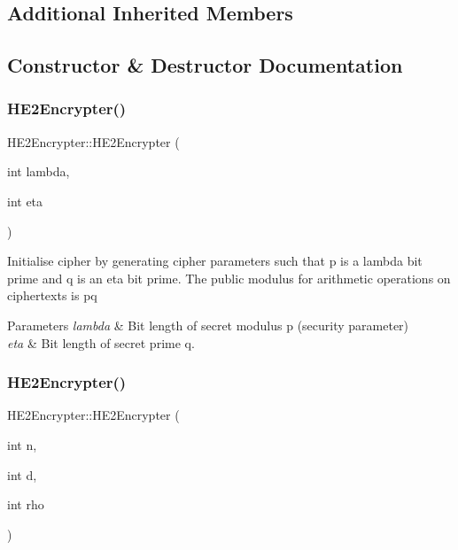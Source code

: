 \subsection*{Additional Inherited Members}


\subsection{Constructor \& Destructor Documentation}
\mbox{\label{classHE2Encrypter_afa15786431e27f582fb4b62282407ed4}} 
\subsubsection{\texorpdfstring{H\+E2\+Encrypter()}{HE2Encrypter()}\hspace{0.1cm}{\footnotesize\ttfamily [1/2]}}
{\footnotesize\ttfamily H\+E2\+Encrypter\+::\+H\+E2\+Encrypter (\begin{DoxyParamCaption}\item[{int}]{lambda,  }\item[{int}]{eta }\end{DoxyParamCaption})}

Initialise cipher by generating cipher parameters such that {\ttfamily p} is a {\ttfamily lambda} bit prime and {\ttfamily q} is an {\ttfamily eta} bit prime. The public modulus for arithmetic operations on ciphertexts is {\ttfamily pq} 
\begin{DoxyParams}{Parameters}
{\em lambda} & Bit length of secret modulus {\ttfamily p} (security parameter) \\
\hline
{\em eta} & Bit length of secret prime {\ttfamily q}. \\
\hline
\end{DoxyParams}
\mbox{\label{classHE2Encrypter_a38f4e27834ca8d2f2169dd8618e66650}} 
\subsubsection{\texorpdfstring{H\+E2\+Encrypter()}{HE2Encrypter()}\hspace{0.1cm}{\footnotesize\ttfamily [2/2]}}
{\footnotesize\ttfamily H\+E2\+Encrypter\+::\+H\+E2\+Encrypter (\begin{DoxyParamCaption}\item[{int}]{n,  }\item[{int}]{d,  }\item[{int}]{rho }\end{DoxyParamCaption})}

